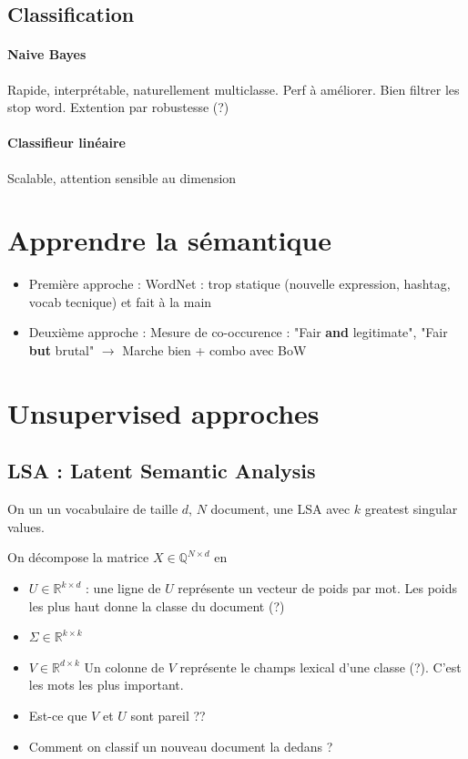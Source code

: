 \documentclass{article}
\theoremstyle{plain}%
\theoremstyle{definition}
\theoremstyle{remark}
\begin{document}
\subsection{Classification}
\paragraph*{Naive Bayes}
Rapide, interprétable, naturellement multiclasse. Perf à améliorer. Bien filtrer les stop word. Extention par robustesse (?)

\paragraph*{Classifieur linéaire}
Scalable, attention sensible au dimension

\section{Apprendre la sémantique}
\begin{itemize}
    \item Première approche : WordNet : trop statique (nouvelle expression, hashtag, vocab tecnique) et fait à la main 
    \item Deuxième approche : Mesure de co-occurence : "Fair \textbf{and} legitimate", "Fair \textbf{but} brutal" $\rightarrow$ Marche bien + combo avec BoW
\end{itemize}

\section{Unsupervised approches}
\subsection{LSA : Latent Semantic Analysis}
On un un vocabulaire de taille $ d $, $ N $ document, une LSA avec $ k $ greatest singular values.

On décompose la matrice $ X \in \mathbb{Q}^{N \times d}$ en \begin{itemize}
    \item $ U \in \mathbb{R}^{k \times d} $ : une ligne de $ U $ représente un vecteur de poids par mot. Les poids les plus haut donne la classe du document (?)
    \item $ \Sigma \in \mathbb{R}^{k \times k} $
    \item $ V \in \mathbb{R}^{d \times k} $ Un colonne de $ V $ représente le champs lexical d'une classe (?). C'est les mots les plus important.
    \item Est-ce que $ V $ et $ U $ sont pareil ?? 
    \item Comment on classif un nouveau document la dedans ? 
\end{itemize}
\end{document}
